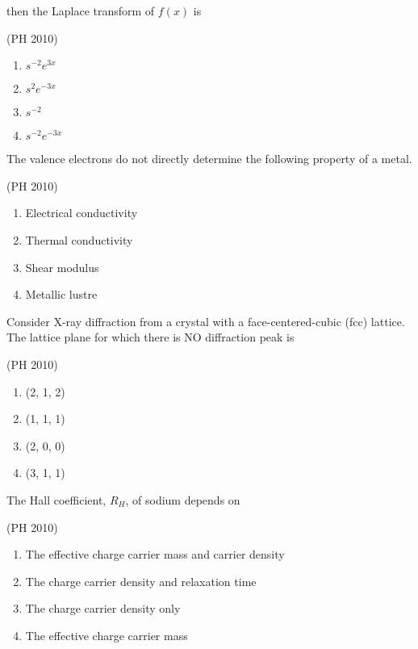 then the Laplace transform of $f(x)$ is 

\hfill{(PH 2010)}
\begin{multicols}{4}
\begin{enumerate}
\item $s^{-2}e^{3x}$
\item $s^{2}e^{-3x}$
\item $s^{-2}$ 
\item $s^{-2}e^{-3x}$
\end{enumerate}
\end{multicols}

\item The valence electrons do not directly determine the following property of a metal. 

\hfill{(PH 2010)}
\begin{enumerate}
\item Electrical conductivity
\item Thermal conductivity
\item Shear modulus
\item Metallic lustre
\end{enumerate}


\item Consider X-ray diffraction from a crystal with a face-centered-cubic (fcc) lattice. The lattice plane for which there is NO diffraction peak is 

\hfill{(PH 2010)}
\begin{multicols}{4}
\begin{enumerate}
\item (2, 1, 2)
\item (1, 1, 1)
\item (2, 0, 0)
\item (3, 1, 1)
\end{enumerate}
\end{multicols}


\item The Hall coefficient, $R_H$, of sodium depends on 

\hfill{(PH 2010)}

\begin{enumerate}
\item The effective charge carrier mass and carrier density 
\item The charge carrier density and relaxation time
\item The charge carrier density only 
\item The effective charge carrier mass
\end{enumerate}


